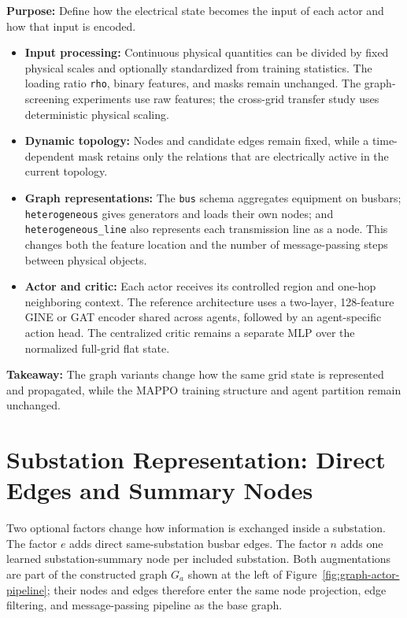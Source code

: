 \begin{tcolorbox}[
  colframe=red!75!black,
  colback=red!5!white,
  title=Chapter Summary (1/3): Graph Construction and Model
]
\textbf{Purpose:} Define how the electrical state becomes the input of each
actor and how that input is encoded.

\begin{itemize}
  \item \textbf{Input processing:} Continuous physical quantities can be
  divided by fixed physical scales and optionally standardized from training
  statistics. The loading ratio \texttt{rho}, binary features, and masks remain
  unchanged. The graph-screening experiments use raw features; the cross-grid
  transfer study uses deterministic physical scaling.
  \item \textbf{Dynamic topology:} Nodes and candidate edges remain fixed, while
  a time-dependent mask retains only the relations that are electrically active
  in the current topology.
  \item \textbf{Graph representations:} The \texttt{bus} schema aggregates
  equipment on busbars; \texttt{heterogeneous} gives generators and loads their
  own nodes; and \texttt{heterogeneous\_line} also represents each transmission
  line as a node. This changes both the feature location and the number of
  message-passing steps between physical objects.
  \item \textbf{Actor and critic:} Each actor receives its controlled region and
  one-hop neighboring context. The reference architecture uses a two-layer,
  128-feature GINE or GAT encoder shared across agents, followed by an
  agent-specific action head. The centralized critic remains a separate MLP
  over the normalized full-grid flat state.
\end{itemize}

\textbf{Takeaway:} The graph variants change how the same grid state is
represented and propagated, while the MAPPO training structure and agent
partition remain unchanged.
\end{tcolorbox}

\section{Substation Representation: Direct Edges and Summary Nodes}
\label{sec:substation-representation}

Two optional factors change how information is exchanged inside a substation.
The factor $e$ adds direct same-substation busbar edges. The factor $n$ adds one
learned substation-summary node per included substation. Both augmentations are
part of the constructed graph $G_a$ shown at the left of
Figure~\ref{fig:graph-actor-pipeline}; their nodes and edges therefore enter the
same node projection, edge filtering, and message-passing pipeline as the base
graph.

